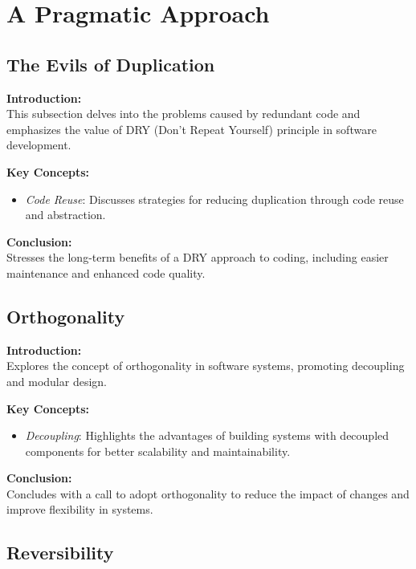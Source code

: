 \section{A Pragmatic Approach}

\subsection{The Evils of Duplication}

\textbf{Introduction:} \\
This subsection delves into the problems caused by redundant code and emphasizes the value of DRY (Don't Repeat Yourself) principle in software development.

\vspace{2mm}
\noindent\textbf{Key Concepts:}
\begin{itemize}
  \item \textit{Code Reuse}: Discusses strategies for reducing duplication through code reuse and abstraction.
\end{itemize}

\vspace{2mm}
\noindent\textbf{Conclusion:} \\
Stresses the long-term benefits of a DRY approach to coding, including easier maintenance and enhanced code quality.

\subsection{Orthogonality}

\textbf{Introduction:} \\
Explores the concept of orthogonality in software systems, promoting decoupling and modular design.

\vspace{2mm}
\noindent\textbf{Key Concepts:}
\begin{itemize}
  \item \textit{Decoupling}: Highlights the advantages of building systems with decoupled components for better scalability and maintainability.
\end{itemize}

\vspace{2mm}
\noindent\textbf{Conclusion:} \\
Concludes with a call to adopt orthogonality to reduce the impact of changes and improve flexibility in systems.

\subsection{Reversibility}

